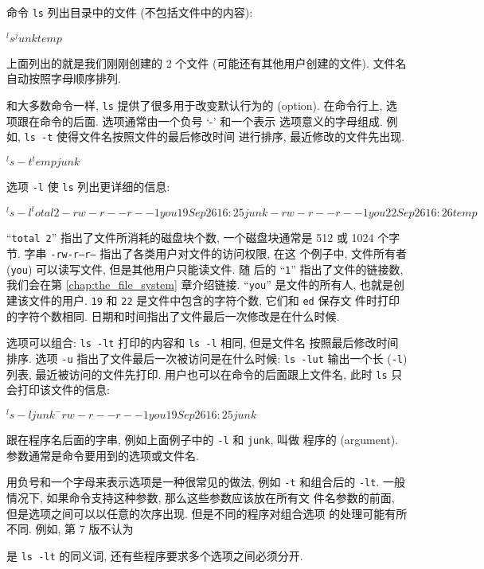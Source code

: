 命令 \texttt{ls} 列出目录中的文件 (不包括文件中的内容):
\begin{upeshell}
$ ^ls^
junk
temp
$
\end{upeshell}
上面列出的就是我们刚刚创建的 2 个文件 (可能还有其他用户创建的文件). 文件名
自动按照字母顺序排列.

和大多数命令一样, \texttt{ls} 提供了很多用于改变默认行为的 
(option). 在命令行上, 选项跟在命令的后面. 选项通常由一个负号 `-' 和一个表示
选项意义的字母组成. 例如, \texttt{ls -t} 使得文件名按照文件的最后修改时间
进行排序, 最近修改的文件先出现.
\begin{upeshell}
$ ^ls -t^
temp
junk
$
\end{upeshell}
选项 \texttt{-l} 使 \texttt{ls} 列出更详细的信息:
\begin{upeshell}
$ ^ls -l^
total 2
-rw-r--r-- 1 you	19 Sep 26 16:25 junk
-rw-r--r-- 1 you	22 Sep 26 16:26 temp
$
\end{upeshell}

``\texttt{total 2}'' 指出了文件所消耗的磁盘块个数, 一个磁盘块通常是 512 或
1024 个字节. 字串 \texttt{-rw-r--r--} 指出了各类用户对文件的访问权限, 在这
个例子中, 文件所有者 (\texttt{you}) 可以读写文件, 但是其他用户只能读文件. 随
后的 ``\texttt{1}'' 指出了文件的链接数, 我们会在第 \ref{chap:the_file_system}
章介绍链接. ``\texttt{you}'' 是文件的所有人, 也就是创建该文件的用户.
\texttt{19} 和 \texttt{22} 是文件中包含的字符个数, 它们和 \texttt{ed} 保存文
件时打印的字符个数相同. 日期和时间指出了文件最后一次修改是在什么时候.

选项可以组合: \texttt{ls -lt} 打印的内容和 \texttt{ls -l} 相同, 但是文件名
按照最后修改时间排序. 选项 \texttt{-u} 指出了文件最后一次被访问是在什么时候:
\texttt{ls -lut} 输出一个长 (\texttt{-l}) 列表, 最近被访问的文件先打印.
用户也可以在命令的后面跟上文件名, 此时 \texttt{ls} 只会打印该文件的信息:
\begin{upeshell}
$ ^ls -l junk^
-rw-r--r-- 1 you	19 Sep 26 16:25 junk
$
\end{upeshell}

跟在程序名后面的字串, 例如上面例子中的 \texttt{-l} 和 \texttt{junk}, 叫做
程序的  (argument). 参数通常是命令要用到的选项或文件名.

用负号和一个字母来表示选项是一种很常见的做法, 例如 \texttt{-t} 和组合后的
\texttt{-lt}. 一般情况下, 如果命令支持这种参数, 那么这些参数应该放在所有文
件名参数的前面, 但是选项之间可以以任意的次序出现. 但是不同的程序对组合选项
的处理可能有所不同. 例如, 第 7 版不认为
是 \texttt{ls -lt} 的同义词, 还有些程序要求多个选项之间必须分开.

